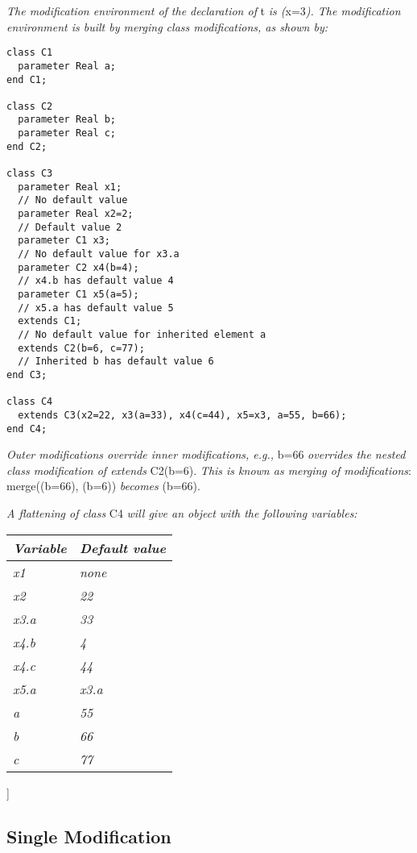 \emph{The modification environment of the declaration of} t \emph{is
(}x=3\emph{). The modification environment is built by merging class
modifications, as shown by: }
\begin{lstlisting}[language=modelica]
class C1
  parameter Real a;
end C1;

class C2
  parameter Real b;
  parameter Real c;
end C2;

class C3
  parameter Real x1;
  // No default value
  parameter Real x2=2;
  // Default value 2
  parameter C1 x3;
  // No default value for x3.a
  parameter C2 x4(b=4);
  // x4.b has default value 4
  parameter C1 x5(a=5);
  // x5.a has default value 5
  extends C1;
  // No default value for inherited element a
  extends C2(b=6, c=77);
  // Inherited b has default value 6
end C3;

class C4
  extends C3(x2=22, x3(a=33), x4(c=44), x5=x3, a=55, b=66);
end C4;
\end{lstlisting}

\emph{Outer modifications override inner modifications, e.g.,} b=66
\emph{overrides the nested class modification of extends} C2(b=6).
\emph{This is known as merging of modifications}: merge((b=66), (b=6))
\emph{becomes} (b=66).

\emph{A flattening of class} C4 \emph{will give an object with the
following variables: }

\begin{longtable}[]{|@{}l|l@{}|}
\hline \endhead
\emph{Variable} & \emph{Default value}\\ \hline
\emph{x1} & \emph{none}\\ \hline
\emph{x2} & \emph{22}\\ \hline
\emph{x3.a} & \emph{33}\\ \hline
\emph{x4.b} & \emph{4}\\ \hline
\emph{x4.c} & \emph{44}\\ \hline
\emph{x5.a} & \emph{x3.a}\\ \hline
\emph{a} & \emph{55}\\ \hline
\emph{b} & \emph{66}\\ \hline
\emph{c} & \emph{77}\\ \hline

\end{longtable}

{]}

\subsection{Single Modification}


